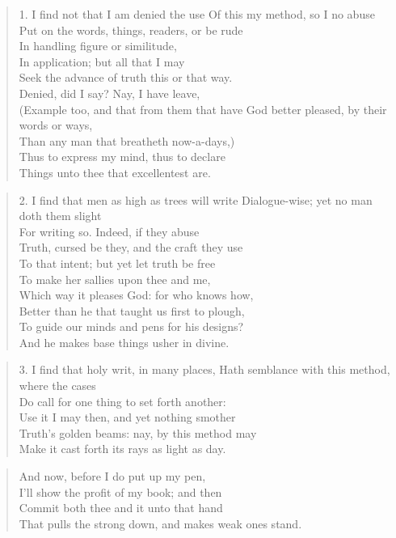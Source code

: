 \begin{verse}
1. I find not that I am denied the use
Of this my method, so I no abuse\\
Put on the words, things, readers, or be rude\\
In handling figure or similitude,\\
In application; but all that I may\\
Seek the advance of truth this or that way.\\
Denied, did I say? Nay, I have leave,\\
(Example too, and that from them that have
God better pleased, by their words or ways,\\
Than any man that breatheth now-a-days,)\\
Thus to express my mind, thus to declare\\
Things unto thee that excellentest are.\\
\end{verse}
\begin{verse}
2. I find that men as high as trees will write
Dialogue-wise; yet no man doth them slight\\
For writing so. Indeed, if they abuse\\
Truth, cursed be they, and the craft they use\\
To that intent; but yet let truth be free\\
To make her sallies upon thee and me,\\
Which way it pleases God: for who knows how,\\
Better than he that taught us first to plough,\\
To guide our minds and pens for his designs?\\
And he makes base things usher in divine.\\
\end{verse}
\begin{verse}
3. I find that holy writ, in many places,
Hath semblance with this method, where the cases\\
Do call for one thing to set forth another:\\
Use it I may then, and yet nothing smother\\
Truth's golden beams: nay, by this method may\\
Make it cast forth its rays as light as day.\\
\end{verse}
\begin{verse}
And now, before I do put up my pen,\\
I'll show the profit of my book; and then\\
Commit both thee and it unto that hand\\
That pulls the strong down, and makes weak ones stand.\\
\end{verse}
